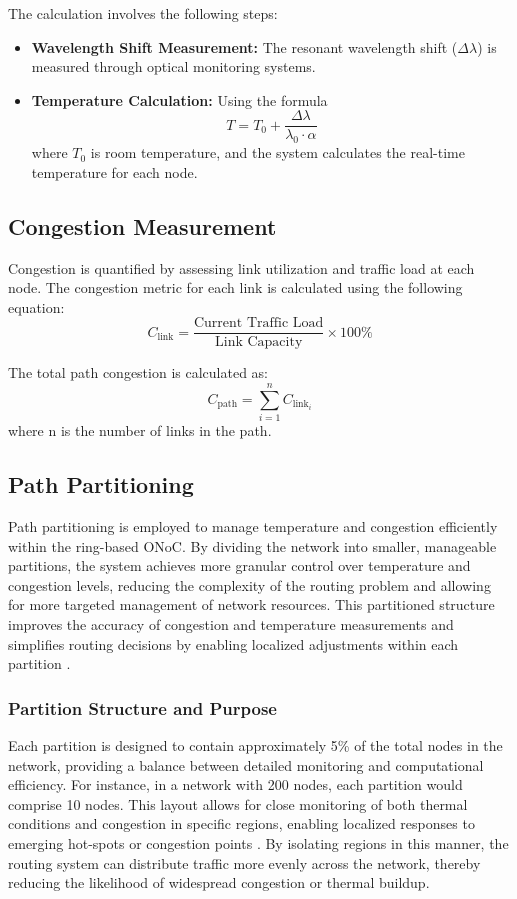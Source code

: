 \documentclass[conference]{IEEEtran}
\begin{document}
The calculation involves the following steps:
\begin{itemize}
    \item \textbf{Wavelength Shift Measurement:} The resonant wavelength shift (\(\Delta \lambda\)) is measured through optical monitoring systems.
    \item \textbf{Temperature Calculation:} Using the formula
    \begin{equation}
    T = T_0 + \frac{\Delta \lambda}{\lambda_0 \cdot \alpha}
    \end{equation}
    where \(T_0\) is room temperature, and the system calculates the real-time temperature for each node.
\end{itemize}

\subsection{Congestion Measurement}
Congestion is quantified by assessing link utilization and traffic load at each node. The congestion metric for each link is calculated using the following equation:
\begin{equation}
    C_{\text{link}} = \frac{\text{Current Traffic Load}}{\text{Link Capacity}} \times 100\%
\end{equation}

The total path congestion is calculated as:
\begin{equation}
    C_{\text{path}} = \sum_{i=1}^{n} C_{\text{link}_i}
\end{equation}
where n is the number of links in the path.

\subsection{Path Partitioning}
Path partitioning is employed to manage temperature and congestion efficiently within the ring-based ONoC. By dividing the network into smaller, manageable partitions, the system achieves more granular control over temperature and congestion levels, reducing the complexity of the routing problem and allowing for more targeted management of network resources. This partitioned structure improves the accuracy of congestion and temperature measurements and simplifies routing decisions by enabling localized adjustments within each partition \cite{chen2020partitioning}.

\subsubsection{Partition Structure and Purpose}
Each partition is designed to contain approximately 5\% of the total nodes in the network, providing a balance between detailed monitoring and computational efficiency. For instance, in a network with 200 nodes, each partition would comprise 10 nodes. This layout allows for close monitoring of both thermal conditions and congestion in specific regions, enabling localized responses to emerging hot-spots or congestion points \cite{liu2019wavelength}. By isolating regions in this manner, the routing system can distribute traffic more evenly across the network, thereby reducing the likelihood of widespread congestion or thermal buildup.
\end{document}
